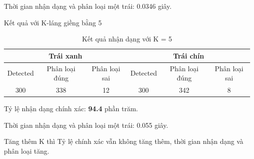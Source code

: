 \documentclass[12pt,a4paper]{article}
\begin{document}
Thời gian nhận dạng và phân loại một trái: 0.0346 giây.


Kết quả với K-láng giềng bằng 5
\begin{center}
	\begin{table}[htp]
	\begin{center}
	\begin{tabular}{|c|c|c|c|c|c|}
	\hline
	\multicolumn{3}{|c|}{Trái xanh} & \multicolumn{3}{|c|}{Trái chín}\\
	\hline
	Detected & Phân loại đúng & Phân loại sai & Detected & Phân loại đúng & Phân loại sai\\
	\hline
	300 & 338 & 12 & 300 & 342 & 8\\
	\hline 
	\end{tabular}
	\begin{center}
	\caption{Kết quả nhận dạng với K = 5}
	\end{center}
	\end{center}
	\end{table}
\end{center}

Tỷ lệ nhận dạng chính xác: \textbf{94.4} phần trăm.

Thời gian nhận dạng và phân loại một trái: 0.055 giây.

Tăng thêm K thì Tỷ lệ chính xác vẫn không tăng thêm, thời gian nhận dạng và phân loại tăng.
\end{document}
